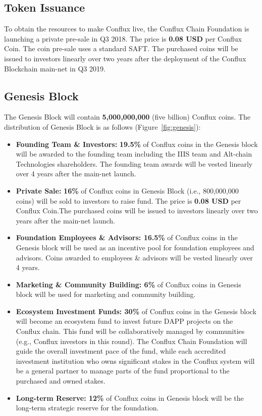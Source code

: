 

\subsection{Token Issuance}

To obtain the resources to make Conflux live, the Conflux Chain Foundation is launching a private pre-sale in Q3 2018. 
The price is {\bf 0.08 USD} per Conflux Coin. 
The coin pre-sale uses a standard SAFT. 
The purchased coins will be issued to investors linearly over two years after the deployment of the Conflux Blockchain main-net in Q3 2019.

\subsection{Genesis Block}
\label{sec:genesis}

The Genesis Block will contain {\bf 5,000,000,000} (five billion) Conflux coins.  
The distribution of Genesis Block is as follows (Figure~\ref{fig:genesis}):

\begin{itemize}
	\item {\bf Founding Team \& Investors:} {\bf 19.5\%} of Conflux coins in the Genesis block will be awarded to the founding team including the IIIS team and Alt-chain Technologies shareholders. The founding team awards will be vested linearly over 4 years after the main-net launch.
	
	\item {\bf Private Sale:} {\bf 16\%} of Conflux coins in Genesis Block (i.e., 800,000,000 coins) will be sold to investors to raise fund. The price is {\bf 0.08 USD} per Conflux Coin.The purchased coins will be issued to investors linearly over two years after the main-net launch.
 

	\item {\bf Foundation Employees \& Advisors: 16.5\%} of Conflux coins in the Genesis block will be used as an incentive pool for foundation employees and advisors. Coins awarded to employees \& advisors will be vested linearly over 4 years.


	\item {\bf Marketing \& Community Building: 6\%} of Conflux coins in Genesis block will be used for marketing and community building.

	\item {\bf Ecosystem Investment Funds: 30\%} of Conflux coins in the Genesis block will become an ecosystem fund to invest future DAPP projects on the Conflux chain. This fund will be collaboratively managed by communities (e.g., Conflux investors in this round). 
	The Conflux Chain Foundation will guide the overall investment pace of the fund, while each accredited investment institution who owns significant stakes in the Conflux system will be a general partner to manage parts of the fund proportional to the purchased and owned stakes.	

	\item {\bf Long-term Reserve: 12\%} of Conflux coins in Genesis block will be the long-term strategic reserve for the foundation.
\end{itemize}


